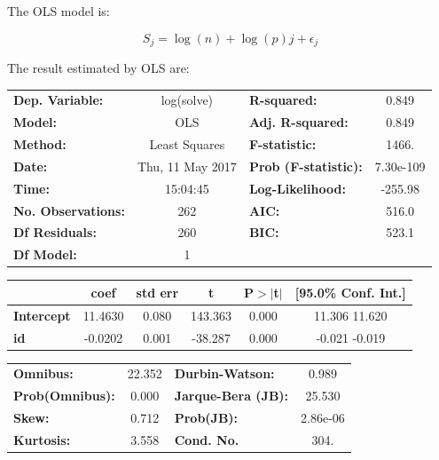 \documentclass{article}
\begin{document}
The OLS model is:

\[
S_j = \log(n) + \log(p) j + \epsilon_j
\]

The result estimated by OLS are:

\begin{center}
\begin{tabular}{lclc}
\toprule
\textbf{Dep. Variable:}    &    log(solve)    & \textbf{  R-squared:         } &     0.849   \\
\textbf{Model:}            &       OLS        & \textbf{  Adj. R-squared:    } &     0.849   \\
\textbf{Method:}           &  Least Squares   & \textbf{  F-statistic:       } &     1466.   \\
\textbf{Date:}             & Thu, 11 May 2017 & \textbf{  Prob (F-statistic):} & 7.30e-109   \\
\textbf{Time:}             &     15:04:45     & \textbf{  Log-Likelihood:    } &   -255.98   \\
\textbf{No. Observations:} &         262      & \textbf{  AIC:               } &     516.0   \\
\textbf{Df Residuals:}     &         260      & \textbf{  BIC:               } &     523.1   \\
\textbf{Df Model:}         &           1      & \textbf{                     } &             \\
\bottomrule
\end{tabular}
\begin{tabular}{lccccc}
                   & \textbf{coef} & \textbf{std err} & \textbf{t} & \textbf{P$>$$|$t$|$} & \textbf{[95.0\% Conf. Int.]}  \\
\midrule
\textbf{Intercept} &      11.4630  &        0.080     &   143.363  &         0.000        &        11.306    11.620       \\
\textbf{id}        &      -0.0202  &        0.001     &   -38.287  &         0.000        &        -0.021    -0.019       \\
\bottomrule
\end{tabular}
\begin{tabular}{lclc}
\textbf{Omnibus:}       & 22.352 & \textbf{  Durbin-Watson:     } &    0.989  \\
\textbf{Prob(Omnibus):} &  0.000 & \textbf{  Jarque-Bera (JB):  } &   25.530  \\
\textbf{Skew:}          &  0.712 & \textbf{  Prob(JB):          } & 2.86e-06  \\
\textbf{Kurtosis:}      &  3.558 & \textbf{  Cond. No.          } &     304.  \\
\bottomrule
\end{tabular}
\end{center}
\end{document}
